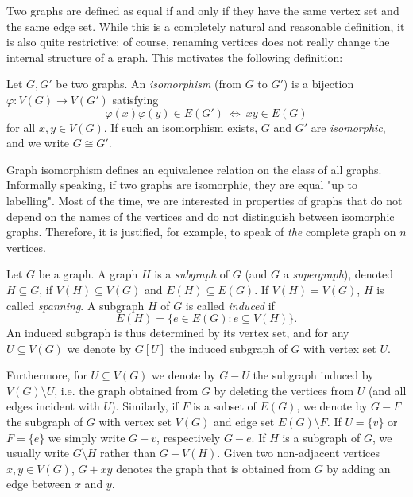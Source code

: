 Two graphs are defined as equal if and only if they have the same vertex set and the same edge set. 
While this is a completely natural and reasonable definition, it is also quite restrictive: of course, renaming vertices does not really change the internal structure of a graph. 
This motivates the following definition:

\begin{definition}
    Let $G, G'$ be two graphs. An \textit{isomorphism} (from $G$ to $G'$) is a bijection $\varphi: V(G) \rightarrow V(G')$ satisfying 
    \begin{equation*}
        \varphi(x) \varphi(y) \in E(G') \ \Longleftrightarrow  \ xy \in E(G)
    \end{equation*}
    for all $x, y \in V(G)$. If such an isomorphism exists, $G$ and $G'$ are \textit{isomorphic}, and we write $G \cong G'$.
\end{definition}

Graph isomorphism defines an equivalence relation on the class of all graphs. 
Informally speaking, if two graphs are isomorphic, they are equal "up to labelling". 
Most of the time, we are interested in properties of graphs that do not depend on the names of the vertices and do not distinguish between isomorphic graphs.
Therefore, it is justified, for example, to speak of \textit{the} complete graph on $n$ vertices.

\begin{definition}
    Let $G$ be a graph. 
    A graph $H$ is a \textit{subgraph} of $G$ (and $G$ a \textit{supergraph}), denoted $H \subseteq G$, if $V(H) \subseteq V(G)$ and $E(H) \subseteq E(G)$. 
    If $V(H) = V(G)$, $H$ is called \textit{spanning}.
    A subgraph $H$ of $G$ is called \textit{induced} if
    \begin{equation*}
        E(H) = \{ e \in E(G) : e \subseteq V(H) \}.
    \end{equation*}
    An induced subgraph is thus determined by its vertex set, and for any $U \subseteq V(G)$ we denote by $G[U]$ the induced subgraph of $G$ with vertex set $U$. 

    Furthermore, for $U \subseteq V(G)$ we denote by $G - U$ the subgraph induced by $V(G) \setminus U$, i.e. the graph obtained from $G$ by deleting the vertices from $U$ (and all edges incident with $U$). 
    Similarly, if $F$ is a subset of $E(G)$, we denote by $G - F$ the subgraph of $G$ with vertex set $V(G)$ and edge set $E(G) \setminus F$. 
    If $U = \{ v \}$ or $F = \{ e \}$ we simply write $G - v$, respectively $G - e$.
    If $H$ is a subgraph of $G$, we usually write $G \setminus H$ rather than $G - V(H)$.
    Given two non-adjacent vertices $x, y \in V(G)$, $G + xy$ denotes the graph that is obtained from $G$ by adding an edge between $x$ and $y$.
\end{definition}

